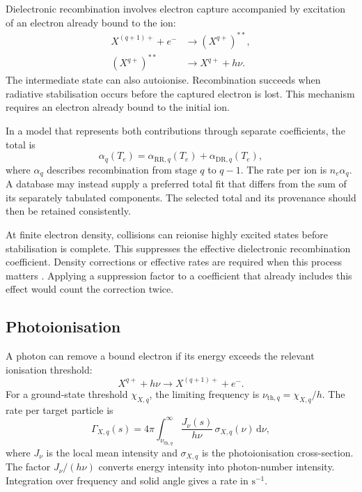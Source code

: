 Dielectronic recombination involves electron capture accompanied by excitation
of an electron already bound to the ion:
\begin{align}
 X^{(q+1)+}+e^- &\longrightarrow (X^{q+})^{**},
 \\
 (X^{q+})^{**} &\longrightarrow X^{q+}+h\nu.
 \label{eq:ion-dr}
\end{align}
The intermediate state can also autoionise. Recombination succeeds when
radiative stabilisation occurs before the captured electron is lost.
This mechanism requires an electron already bound to the initial ion.

In a model that represents both contributions through separate coefficients,
the total is
\begin{equation}
 \alpha_q(T_e)
 =\alpha_{\mathrm{RR},q}(T_e)+\alpha_{\mathrm{DR},q}(T_e),
 \label{eq:ion-recombination}
\end{equation}
where $\alpha_q$ describes recombination from stage $q$ to $q-1$.
The rate per ion is $n_e\alpha_q$. A database may instead supply a preferred
total fit that differs from the sum of its separately tabulated components.
The selected total and its provenance should then be retained consistently.

At finite electron density, collisions can reionise highly excited states
before stabilisation is complete. This suppresses the effective dielectronic
recombination coefficient. Density corrections or effective rates are required
when this process matters \citep{Nikolic2018,Dufresne2024}.
Applying a suppression factor to a coefficient that already includes this
effect would count the correction twice.

\subsection{Photoionisation}

A photon can remove a bound electron if its energy exceeds the relevant
ionisation threshold:
\begin{equation}
 X^{q+}+h\nu\longrightarrow X^{(q+1)+}+e^-.
 \label{eq:ion-photo-reaction}
\end{equation}
For a ground-state threshold $\chi_{X,q}$, the limiting frequency is
$\nu_{\mathrm{th},q}=\chi_{X,q}/h$. The rate per target particle is
\begin{equation}
 \Gamma_{X,q}(s)=4\pi\int_{\nu_{\mathrm{th},q}}^\infty
 \frac{J_\nu(s)}{h\nu}\,\sigma_{X,q}(\nu)\,\mathrm{d}\nu,
 \label{eq:ion-photo-frequency}
\end{equation}
where $J_\nu$ is the local mean intensity and $\sigma_{X,q}$ is the
photoionisation cross-section. The factor $J_\nu/(h\nu)$ converts energy
intensity into photon-number intensity. Integration over frequency and solid
angle gives a rate in $\mathrm{s^{-1}}$.

